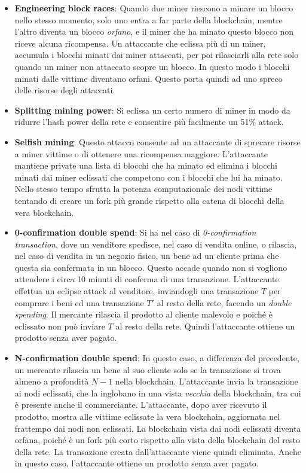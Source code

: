 \begin{itemize}
	\item \textbf{Engineering block races}: Quando due miner riescono a minare un blocco nello stesso momento, solo uno entra a far parte della blockchain, mentre l'altro diventa un blocco \emph{orfano}, e il miner che ha minato questo blocco non riceve alcuna ricompensa. Un attaccante che eclissa più di un miner, accumula i blocchi minati dai miner attaccati, per poi rilasciarli alla rete solo quando un miner non attaccato scopre un blocco. In questo modo i blocchi minati dalle vittime diventano orfani. Questo porta quindi ad uno spreco delle risorse degli attaccati.
	\item \textbf{Splitting mining power}: Si eclissa un certo numero di miner in modo da ridurre l'hash power della rete e consentire più facilmente un 51\% attack.
	\item \textbf{Selfish mining}: Questo attacco consente ad un attaccante di sprecare risorse a miner vittime o di ottenere una ricompensa maggiore. L'attaccante mantiene private una lista di blocchi che ha minato ed elimina i blocchi minati dai miner eclissati che competono con i blocchi che lui ha minato. Nello stesso tempo sfrutta la potenza computazionale dei nodi vittime tentando di creare un fork più grande rispetto alla catena di blocchi della vera blockchain.
	\item \textbf{0-confirmation double spend}: Si ha nel caso di \emph{0-confirmation transaction}, dove un venditore spedisce, nel caso di vendita online, o rilascia, nel caso di vendita in un negozio fisico, un bene ad un cliente prima che questa sia confermata in un blocco. Questo accade quando non si vogliono attendere i circa 10 minuti di conferma di una transazione. L'attaccante effettua un eclipse attack al venditore, inviandogli una transazione $T$ per comprare i beni ed una transazione $T'$ al resto della rete, facendo un \emph{double spending}. Il mercante rilascia il prodotto al cliente malevolo e poiché è eclissato non può inviare $T$ al resto della rete. Quindi l'attaccante ottiene un prodotto senza aver pagato.
	\item \textbf{N-confirmation double spend}: In questo caso, a differenza del precedente, un mercante rilascia un bene al suo cliente solo se la transazione si trova almeno a profondità $N-1$ nella blockchain. L'attaccante invia la transazione ai nodi eclissati, che la inglobano in una vista \emph{vecchia} della blockchain, tra cui è presente anche il commerciante. L'attaccante, dopo aver ricevuto il prodotto, mostra alle vittime eclissate la vera blockchain, aggiornata nel frattempo dai nodi non eclissati. La blockchain vista dai nodi eclissati diventa orfana, poiché è un fork più corto rispetto alla vista della blockchain del resto della rete. La transazione creata dall'attaccante viene quindi eliminata. Anche in questo caso, l'attaccante ottiene un prodotto senza aver pagato.
\end{itemize}


